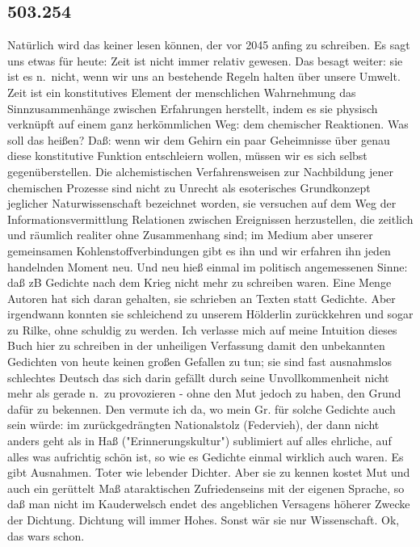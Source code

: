 \documentclass[
]{article}
\author{}
\date{\vspace{-2.5em}}
\begin{document}
\subsection{503.254}\label{section}

Natürlich wird das keiner lesen können, der vor 2045 anfing zu
schreiben. Es sagt uns etwas für heute: Zeit ist nicht immer relativ
gewesen. Das besagt weiter: sie ist es n.~nicht, wenn wir uns an
bestehende Regeln halten über unsere Umwelt. Zeit ist ein konstitutives
Element der menschlichen Wahrnehmung das Sinnzusammenhänge zwischen
Erfahrungen herstellt, indem es sie physisch verknüpft auf einem ganz
herkömmlichen Weg: dem chemischer Reaktionen. Was soll das heißen? Daß:
wenn wir dem Gehirn ein paar Geheimnisse über genau diese konstitutive
Funktion entschleiern wollen, müssen wir es sich selbst
gegenüberstellen. Die alchemistischen Verfahrensweisen zur Nachbildung
jener chemischen Prozesse sind nicht zu Unrecht als esoterisches
Grundkonzept jeglicher Naturwissenschaft bezeichnet worden, sie
versuchen auf dem Weg der Informationsvermittlung Relationen zwischen
Ereignissen herzustellen, die zeitlich und räumlich realiter ohne
Zusammenhang sind; im Medium aber unserer gemeinsamen
Kohlenstoffverbindungen gibt es ihn und wir erfahren ihn jeden
handelnden Moment neu. Und neu hieß einmal im politisch angemessenen
Sinne: daß zB Gedichte nach dem Krieg nicht mehr zu schreiben waren.
Eine Menge Autoren hat sich daran gehalten, sie schrieben an Texten
statt Gedichte. Aber irgendwann konnten sie schleichend zu unserem
Hölderlin zurückkehren und sogar zu Rilke, ohne schuldig zu werden. Ich
verlasse mich auf meine Intuition dieses Buch hier zu schreiben in der
unheiligen Verfassung damit den unbekannten Gedichten von heute keinen
großen Gefallen zu tun; sie sind fast ausnahmslos schlechtes Deutsch das
sich darin gefällt durch seine Unvollkommenheit nicht mehr als gerade
n.~zu provozieren - ohne den Mut jedoch zu haben, den Grund dafür zu
bekennen. Den vermute ich da, wo mein Gr. für solche Gedichte auch sein
würde: im zurückgedrängten Nationalstolz (Federvieh), der dann nicht
anders geht als in Haß ("Erinnerungskultur") sublimiert auf alles
ehrliche, auf alles was aufrichtig schön ist, so wie es Gedichte einmal
wirklich auch waren. Es gibt Ausnahmen. Toter wie lebender Dichter. Aber
sie zu kennen kostet Mut und auch ein gerüttelt Maß ataraktischen
Zufriedenseins mit der eigenen Sprache, so daß man nicht im Kauderwelsch
endet des angeblichen Versagens höherer Zwecke der Dichtung. Dichtung
will immer Hohes. Sonst wär sie nur Wissenschaft. Ok, das wars schon.
\end{document}
